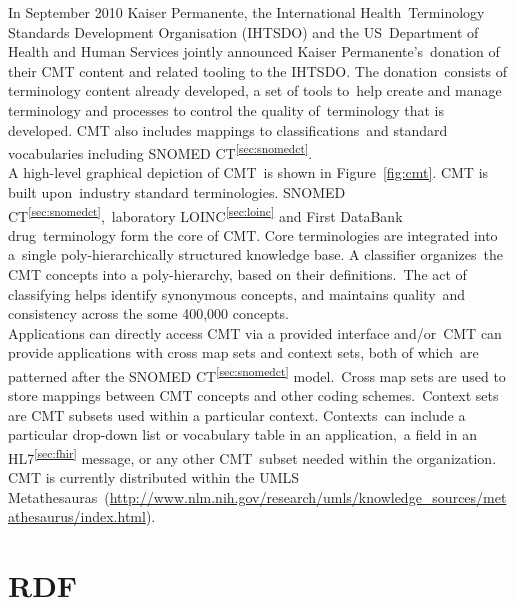 \documentclass[DIV=calc, paper=a4, fontsize=12pt, onecolumn]{scrartcl}	 %
\begin{document}
  \noindent In September 2010 Kaiser Permanente, the International Health\
  Terminology Standards Development Organisation (IHTSDO) and the US\
  Department of Health and Human Services jointly announced Kaiser Permanente's\
  donation of their CMT content and related tooling to the IHTSDO. The donation\
  consists of terminology content already developed, a set of tools to\
  help create and manage terminology and processes to control the quality of\
  terminology that is developed. CMT also includes mappings to classifications\
  and standard vocabularies including SNOMED CT\textsuperscript{\ref{sec:snomedct}}.\\
  
  \noindent A high-level graphical depiction of CMT\
  is shown in Figure~\ref{fig:cmt}. CMT is built upon\
  industry standard terminologies. SNOMED CT\textsuperscript{\ref{sec:snomedct}},\
  laboratory LOINC\textsuperscript{\ref{sec:loinc}} and First DataBank drug\
  terminology form the core of CMT. Core terminologies are integrated into a\
  single poly-hierarchically structured knowledge base. A classifier organizes\
  the CMT concepts into a poly-hierarchy, based on their definitions.\
  The act of classifying helps identify synonymous concepts, and maintains quality\
  and consistency across the some 400,000 concepts.\\
  
  \noindent Applications can directly access CMT via a provided interface and/or\
  CMT can provide applications with cross map sets and context sets, both of which\
  are patterned after the SNOMED CT\textsuperscript{\ref{sec:snomedct}} model.\
  Cross map sets are used to store mappings between CMT concepts and other coding schemes.\
  Context sets are CMT subsets used within a particular context. Contexts\
  can include a particular drop-down list or vocabulary table in an application,\
  a field in an HL7\textsuperscript{\ref{sec:fhir}} message, or any other CMT\
  subset needed within the organization.\\
  
  \noindent CMT is currently distributed within the UMLS Metathesauras\
  (\url{http://www.nlm.nih.gov/research/umls/knowledge_sources/metathesaurus/index.html}).
  
  


 \section[Resource Description Framework (RDF)]{RDF}
  \label{sec:rdf}
\end{document}
